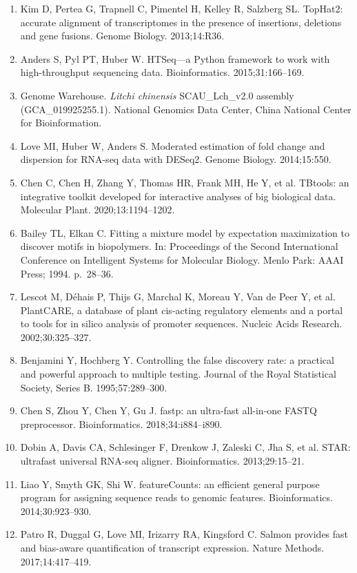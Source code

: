 \documentclass[11pt]{article}
\begin{document}
\begin{enumerate}[itemsep=1pt,leftmargin=1.6em]
\item Kim D, Pertea G, Trapnell C, Pimentel H, Kelley R, Salzberg SL. TopHat2: accurate alignment of transcriptomes in the presence of insertions, deletions and gene fusions. Genome Biology. 2013;14:R36.
\item Anders S, Pyl PT, Huber W. HTSeq---a Python framework to work with high-throughput sequencing data. Bioinformatics. 2015;31:166--169.
\item Genome Warehouse. \textit{Litchi chinensis} SCAU\_Lch\_v2.0 assembly (GCA\_019925255.1). National Genomics Data Center, China National Center for Bioinformation.
\item Love MI, Huber W, Anders S. Moderated estimation of fold change and dispersion for RNA-seq data with DESeq2. Genome Biology. 2014;15:550.
\item Chen C, Chen H, Zhang Y, Thomas HR, Frank MH, He Y, et al. TBtools: an integrative toolkit developed for interactive analyses of big biological data. Molecular Plant. 2020;13:1194--1202.
\item Bailey TL, Elkan C. Fitting a mixture model by expectation maximization to discover motifs in biopolymers. In: Proceedings of the Second International Conference on Intelligent Systems for Molecular Biology. Menlo Park: AAAI Press; 1994. p.~28--36.
\item Lescot M, D\'ehais P, Thijs G, Marchal K, Moreau Y, Van de Peer Y, et al. PlantCARE, a database of plant cis-acting regulatory elements and a portal to tools for in silico analysis of promoter sequences. Nucleic Acids Research. 2002;30:325--327.
\item Benjamini Y, Hochberg Y. Controlling the false discovery rate: a practical and powerful approach to multiple testing. Journal of the Royal Statistical Society, Series B. 1995;57:289--300.
\item Chen S, Zhou Y, Chen Y, Gu J. fastp: an ultra-fast all-in-one FASTQ preprocessor. Bioinformatics. 2018;34:i884--i890.
\item Dobin A, Davis CA, Schlesinger F, Drenkow J, Zaleski C, Jha S, et al. STAR: ultrafast universal RNA-seq aligner. Bioinformatics. 2013;29:15--21.
\item Liao Y, Smyth GK, Shi W. featureCounts: an efficient general purpose program for assigning sequence reads to genomic features. Bioinformatics. 2014;30:923--930.
\item Patro R, Duggal G, Love MI, Irizarry RA, Kingsford C. Salmon provides fast and bias-aware quantification of transcript expression. Nature Methods. 2017;14:417--419.

\end{enumerate}
\end{document}
